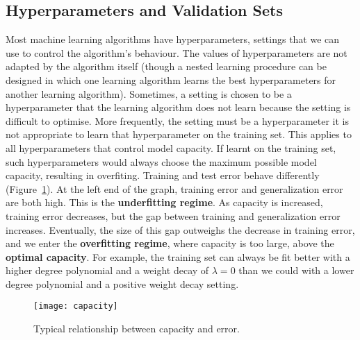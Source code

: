 \subsection{Hyperparameters and Validation Sets}
Most machine learning algorithms have hyperparameters, settings that we can use
to control the algorithm's behaviour. The values of hyperparameters are not
adapted by the algorithm itself (though a nested learning procedure can be
designed in which one learning algorithm learns the best hyperparameters for
another learning algorithm). Sometimes, a setting is chosen to be a
hyperparameter that the learning algorithm does not learn because the setting
is difficult to optimise. More frequently, the setting must be a hyperparameter
it is not appropriate to learn that hyperparameter on the training set. This
applies to all hyperparameters that control model capacity. If learnt on the
training set, such hyperparameters would always choose the maximum possible
model capacity, resulting in overfiting. Training and test error behave
differently (Figure~\ref{fig:capacity}). At the left end of the graph, training
error and generalization error are both high. This is the
\textbf{underfitting regime}. As capacity is increased, training error
decreases, but the gap between training and generalization error increases.
Eventually, the size of this gap outweighs the decrease in training error,
and we enter the \textbf{overfitting regime}, where capacity is too large,
above the \textbf{optimal capacity}. For example, the training set can always
be fit better with a higher degree polynomial and a weight decay of $\lambda =
0$ than we could with a lower degree polynomial and a positive weight decay
setting.
\begin{figure}[h]
    \centering
    \texttt{[image: capacity]}
    \caption{Typical relationship between capacity and error.}
    \label{fig:capacity}
\end{figure}


